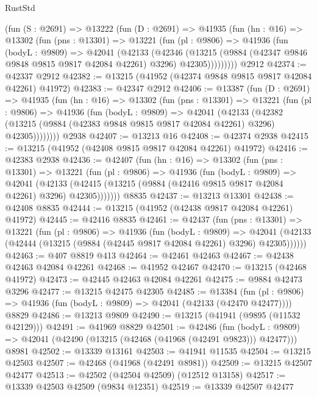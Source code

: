 \begin{lexlean}{RustStd}
\begin{coremodule}
    (fun (S : @2691) =>
    @13222
      (fun (D : @2691) =>
      @41935
        (fun (hn : @16) =>
        @13302
          (fun (pns : @13301) =>
          @13221
            (fun (pl : @9806) =>
            @41936
              (fun (bodyL : @9809) =>
              @42041
                (@42133
                  (@42346
                    (@13215
                      (@9884 (@42347 @9846 @9848 @9815 @9817 @42084 @42261) @3296)
                      @42305)))))))))
    @2912
@42374 := @42337 @2912
@42382 := @13215 (@41952 (@42374 @9848 @9815 @9817 @42084 @42261) @41972)
@42383 := @42347 @2912
@42406 := @13387
    (fun (D : @2691) =>
    @41935
      (fun (hn : @16) =>
      @13302
        (fun (pns : @13301) =>
        @13221
          (fun (pl : @9806) =>
          @41936
            (fun (bodyL : @9809) =>
            @42041
              (@42133
                (@42382
                  (@13215 (@9884 (@42383 @9848 @9815 @9817 @42084 @42261) @3296) @42305))))))))
    @2938
@42407 := @13213 @16
@42408 := @42374 @2938
@42415 := @13215 (@41952 (@42408 @9815 @9817 @42084 @42261) @41972)
@42416 := @42383 @2938
@42436 := @42407
    (fun (hn : @16) =>
    @13302
      (fun (pns : @13301) =>
      @13221
        (fun (pl : @9806) =>
        @41936
          (fun (bodyL : @9809) =>
          @42041
            (@42133 (@42415 (@13215 (@9884 (@42416 @9815 @9817 @42084 @42261) @3296) @42305)))))))
    @8835
@42437 := @13213 @13301
@42438 := @42408 @8835
@42444 := @13215 (@41952 (@42438 @9817 @42084 @42261) @41972)
@42445 := @42416 @8835
@42461 := @42437
    (fun (pns : @13301) =>
    @13221
      (fun (pl : @9806) =>
      @41936
        (fun (bodyL : @9809) =>
        @42041 (@42133 (@42444 (@13215 (@9884 (@42445 @9817 @42084 @42261) @3296) @42305))))))
@42463 := @407 @8819 @413
@42464 := @42461 @42463
@42467 := @42438 @42463 @42084 @42261
@42468 := @41952 @42467
@42470 := @13215 (@42468 @41972)
@42473 := @42445 @42463 @42084 @42261
@42475 := @9884 @42473 @3296
@42477 := @13215 @42475 @42305
@42485 := @13384
    (fun (pl : @9806) => @41936 (fun (bodyL : @9809) => @42041 (@42133 (@42470 @42477))))
    @8829
@42486 := @13213 @9809
@42490 := @13215 (@41941 (@9895 (@11532 @42129)))
@42491 := @41969 @8829
@42501 := @42486
    (fun (bodyL : @9809) => @42041 (@42490 (@13215 (@42468 (@41968 (@42491 @9823))) @42477)))
    @8981
@42502 := @13339 @13161
@42503 := @41941 @11535
@42504 := @13215 @42503
@42507 := @42468 (@41968 (@42491 @8981))
@42509 := @13215 @42507 @42477
@42513 := @42502 (@42504 @42509) (@12512 @13158)
@42517 := @13339 @42503 @42509 (@9834 @12351)
@42519 := @13339 @42507 @42477

\end{coremodule}
\end{lexlean}

